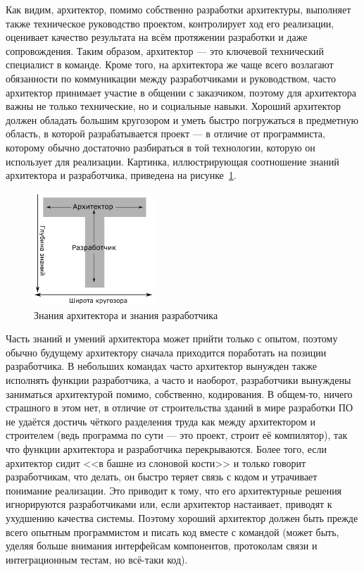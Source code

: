 \documentclass[a5paper]{article}
\begin{document}
Как видим, архитектор, помимо собственно разработки архитектуры, выполняет также техническое руководство проектом, контролирует ход его реализации, оценивает качество результата на всём протяжении разработки и даже сопровождения. Таким образом, архитектор --- это ключевой технический специалист в команде. Кроме того, на архитектора же чаще всего возлагают обязанности по коммуникации между разработчиками и руководством, часто архитектор принимает участие в общении с заказчиком, поэтому для архитектора важны не только технические, но и социальные навыки. Хороший архитектор должен обладать большим кругозором и уметь быстро погружаться в предметную область, в которой разрабатывается проект --- в отличие от программиста, которому обычно достаточно разбираться в той технологии, которую он использует для реализации. Картинка, иллюстрирующая соотношение знаний архитектора и разработчика, приведена на рисунке~\ref{figure:architectVsDeveloper}.

\begin{figure}
	\begin{center}
		\includegraphics[width=0.4\textwidth]{architectVsDeveloper.png}
	\end{center}
	\caption{Знания архитектора и знания разработчика}
	\label{figure:architectVsDeveloper}
\end{figure}

Часть знаний и умений архитектора может прийти только с опытом, поэтому обычно будущему архитектору сначала приходится поработать на позиции разработчика. В небольших командах часто архитектор вынужден также исполнять функции разработчика, а часто и наоборот, разработчики вынуждены заниматься архитектурой помимо, собственно, кодирования. В общем-то, ничего страшного в этом нет, в отличие от строительства зданий в мире разработки ПО не удаётся достичь чёткого разделения труда как между архитектором и строителем (ведь программа по сути --- это проект, строит её компилятор), так что функции архитектора и разработчика перекрываются. Более того, если архитектор сидит <<в башне из слоновой кости>> и только говорит разработчикам, что делать, он быстро теряет связь с кодом и утрачивает понимание реализации. Это приводит к тому, что его архитектурные решения игнорируются разработчиками или, если архитектор настаивает, приводят к ухудшению качества системы. Поэтому хороший архитектор должен быть прежде всего опытным программистом и писать код вместе с командой (может быть, уделяя больше внимания интерфейсам компонентов, протоколам связи и интеграционным тестам, но всё-таки код). 
\end{document}
